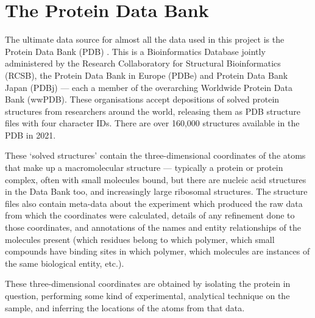 \section{The Protein Data Bank}

The ultimate data source for almost all the data used in this project is the Protein Data Bank (PDB) \cite{burley2020pdb}. This is a Bioinformatics Database jointly administered by the Research Collaboratory for Structural Bioinformatics (RCSB), the Protein Data Bank in Europe (PDBe) and Protein Data Bank Japan (PDBj) --- each a member of the overarching Worldwide Protein Data Bank (wwPDB). These organisations accept depositions of solved protein structures from researchers around the world, releasing them as PDB structure files with four character IDs. There are over 160,000 structures available in the PDB in 2021.

These `solved structures' contain the three-dimensional coordinates of the atoms that make up a macromolecular structure --- typically a protein or protein complex, often with small molecules bound, but there are nucleic acid structures in the Data Bank too, and increasingly large ribosomal structures. The structure files also contain meta-data about the experiment which produced the raw data from which the coordinates were calculated, details of any refinement done to those coordinates, and annotations of the names and entity relationships of the molecules present (which residues belong to which polymer, which small compounds have binding sites in which polymer, which molecules are instances of the same biological entity, etc.).

These three-dimensional coordinates are obtained by isolating the protein in question, performing some kind of experimental, analytical technique on the sample, and inferring the locations of the atoms from that data.

